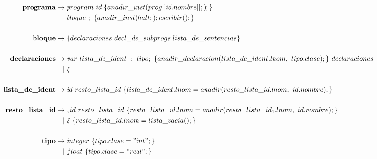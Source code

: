 \documentclass[12pt,a4paper,landscape]{article}
\theoremstyle{mytheor}
\begin{document}
\begin{center}
  \begin{align*}
    \text{\textbf{programa}} \to\ & program\ id\ \{ anadir\_inst( prog|| id.nombre || ;); \}\\
    & bloque\  ;\  \{ anadir\_inst(halt; ); escribir();\}\\\\
    \text{\textbf{ bloque}} \to\ &\{ declaraciones\ decl\_de\_subprogs\ lista\_de\_sentencias \}\\\\
    \text{\textbf{declaraciones}} \to\ & var\ lista\_de\_ident\ :\ tipo;\ \{ anadir\_declaracion(lista\_de\_ident.lnom,\ tipo.clase);\}\ declaraciones\\
    |\ &\xi\\\\
    \text{\textbf{lista\_de\_ident}} \to\ & id\ resto\_lista\_id\ \{lista\_de\_ident.lnom=anadir(resto\_lista\_id.lnom,\ id.nombre);\}\\\\
    \text{\textbf{ resto\_lista\_id}} \to\ & ,id\ resto\_lista\_id\  \{resto\_lista\_id.lnom=anadir(resto\_lista\_id_1.lnom,\ id.nombre);\} \\
    |\ &\xi\ \{resto\_lista\_id.lnom=lista\_vacia();\}\\\\
     \text{\textbf{tipo}} \to\ & integer\ \{tipo.clase="int"; \}\\
    |\ & float\ \{tipo.clase="real"; \}\\\\
  \end{align*}
\end{center}
\end{document}
